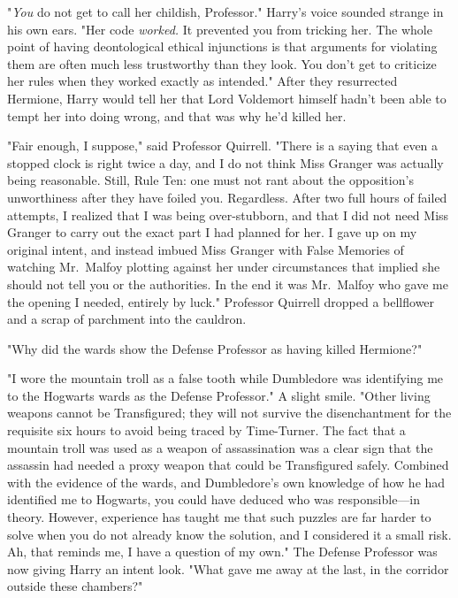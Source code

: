 "\emph{You} do not get to call her childish, Professor." Harry's voice sounded 
strange in his own ears. "Her code \emph{worked.} It prevented you from 
tricking her. The whole point of having deontological ethical injunctions is 
that arguments for violating them are often much less trustworthy than they 
look. You don't get to criticize her rules when they worked exactly as 
intended." After they resurrected Hermione, Harry would tell her that Lord 
Voldemort himself hadn't been able to tempt her into doing wrong, and that was 
why he'd killed her.

"Fair enough, I suppose," said Professor Quirrell. "There is a saying that even 
a stopped clock is right twice a day, and I do not think Miss Granger was 
actually being reasonable. Still, Rule Ten: one must not rant about the 
opposition's unworthiness after they have foiled you. Regardless. After two 
full hours of failed attempts, I realized that I was being over-stubborn, and 
that I did not need Miss Granger to carry out the exact part I had planned for 
her. I gave up on my original intent, and instead imbued Miss Granger with 
False Memories of watching Mr.~Malfoy plotting against her under circumstances 
that implied she should not tell you or the authorities. In the end it was 
Mr.~Malfoy who gave me the opening I needed, entirely by luck." Professor 
Quirrell dropped a bellflower and a scrap of parchment into the cauldron.

"Why did the wards show the Defense Professor as having killed Hermione?"

"I wore the mountain troll as a false tooth while Dumbledore was identifying me 
to the Hogwarts wards as the Defense Professor." A slight smile. "Other living 
weapons cannot be Transfigured; they will not survive the disenchantment for 
the requisite six hours to avoid being traced by Time-Turner. The fact that a 
mountain troll was used as a weapon of assassination was a clear sign that the 
assassin had needed a proxy weapon that could be Transfigured safely. Combined 
with the evidence of the wards, and Dumbledore's own knowledge of how he had 
identified me to Hogwarts, you could have deduced who was responsible---in 
theory. However, experience has taught me that such puzzles are far harder to 
solve when you do not already know the solution, and I considered it a small 
risk. Ah, that reminds me, I have a question of my own." The Defense Professor 
was now giving Harry an intent look. "What gave me away at the last, in the 
corridor outside these chambers?"

